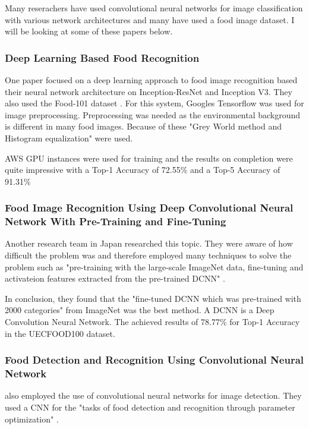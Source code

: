 Many reserachers have used convolutional neural networks for image
classification with various network architectures and many have used a food image dataset. I will be looking at
some of these papers below.

\subsubsection{Deep Learning Based Food Recognition}
One paper focused on a deep learning approach to food image recognition based
their neural network architecture on Inception-ResNet and Inception V3. They
also used the Food-101 dataset \textcite{deepLearning}. For this system, Googles
Tensorflow was used for image preprocessing. Preprocessing was needed as the
environmental background is different in many food images. Because of these
"Grey World method and Histogram equalization" \textcite{deepLearning} were
used.

AWS GPU instances were used for training and the results on completion were
quite impressive with a Top-1 Accuracy of 72.55\% and a Top-5 Accuracy of
91.31\% \textcite{deepLearning}

\subsubsection{Food Image Recognition Using Deep Convolutional Neural Network
With Pre-Training and Fine-Tuning}
Another research team in Japan researched this topic. They were aware of how
difficult the problem was and therefore employed many techniques to solve the
problem such as "pre-training with the large-scale ImageNet data, fine-tuning
and activateion features extracted from the pre-trained DCNN"
\textcite{yanaiFood}. 

In conclusion, they found that the "fine-tuned DCNN which was pre-trained
with 2000 categories" \textcite{yanaiFood} from ImageNet was the best method. A
DCNN is a Deep Convolution Neural Network. The achieved results of 78.77\% for
Top-1 Accuracy in the UECFOOD100 dataset.

\subsubsection{Food Detection and Recognition Using Convolutional Neural Network}
\textcite{kagayaFood} also employed the use of convolutional neural networks for
image detection. They used a CNN for the "tasks of food detection and recognition
through parameter optimization" \textcite{kagayaFood}.

